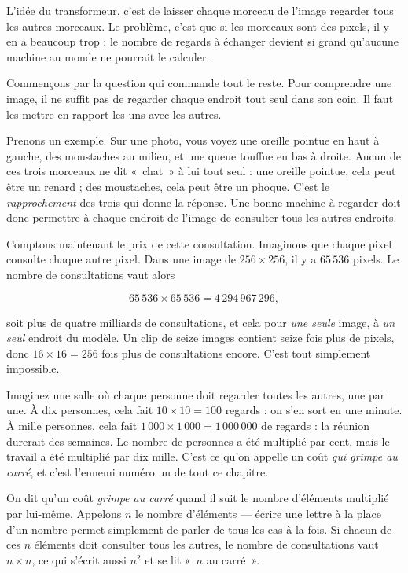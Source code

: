 \begin{enclair}
L'idée du transformeur, c'est de laisser chaque morceau de l'image regarder
tous les autres morceaux. Le problème, c'est que si les morceaux sont des
pixels, il y en a beaucoup trop : le nombre de regards à échanger devient
si grand qu'aucune machine au monde ne pourrait le calculer.
\end{enclair}

Commençons par la question qui commande tout le reste. Pour comprendre une
image, il ne suffit pas de regarder chaque endroit tout seul dans son coin.
Il faut les mettre en rapport les uns avec les autres.

Prenons un exemple. Sur une photo, vous voyez une oreille pointue en haut à
gauche, des moustaches au milieu, et une queue touffue en bas à droite.
Aucun de ces trois morceaux ne dit «~chat~» à lui tout seul : une oreille
pointue, cela peut être un renard ; des moustaches, cela peut être un phoque.
C'est le \emph{rapprochement} des trois qui donne la réponse. Une bonne
machine à regarder doit donc permettre à chaque endroit de l'image de
consulter tous les autres endroits.

Comptons maintenant le prix de cette consultation. Imaginons que chaque
pixel consulte chaque autre pixel. Dans une image de $256 \times 256$, il y
a $65\,536$ pixels. Le nombre de consultations vaut alors

\[
  65\,536 \times 65\,536 = 4\,294\,967\,296 ,
\]

soit plus de quatre milliards de consultations, et cela pour \emph{une
seule} image, à \emph{un seul} endroit du modèle. Un clip de seize images
contient seize fois plus de pixels, donc $16 \times 16 = 256$ fois plus de
consultations encore. C'est tout simplement impossible.

\begin{intuition}
Imaginez une salle où chaque personne doit regarder toutes les autres, une
par une. À dix personnes, cela fait $10 \times 10 = 100$ regards : on s'en
sort en une minute. À mille personnes, cela fait $1\,000 \times 1\,000 =
1\,000\,000$ de regards : la réunion durerait des semaines. Le nombre de
personnes a été multiplié par cent, mais le travail a été multiplié par dix
mille. C'est ce qu'on appelle un coût \emph{qui grimpe au carré}, et c'est
l'ennemi numéro un de tout ce chapitre.
\end{intuition}

\begin{definition}
On dit qu'un coût \emph{grimpe au carré} quand il suit le nombre d'éléments
multiplié par lui-même. Appelons $n$ le nombre d'éléments — écrire une
lettre à la place d'un nombre permet simplement de parler de tous les cas à
la fois. Si chacun de ces $n$ éléments doit consulter tous les autres, le
nombre de consultations vaut $n \times n$, ce qui s'écrit aussi $n^2$ et se
lit «~$n$ au carré~».
\end{definition}

